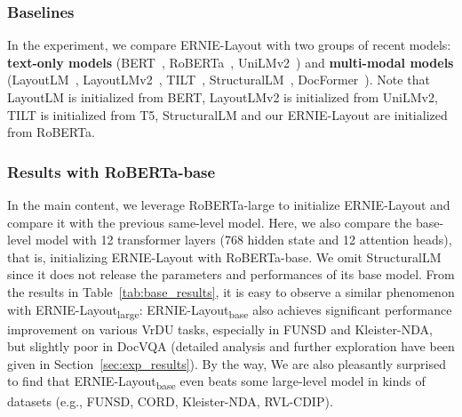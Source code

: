 \documentclass[11pt]{article}
\begin{document}
\subsubsection{Baselines}

In the experiment, we compare ERNIE-Layout with two groups of recent models: \textbf{text-only models} (BERT~\cite{devlin2019bert}, RoBERTa~\cite{liu2019roberta}, UniLMv2~\cite{bao2020unilmv2}) and \textbf{multi-modal models} (LayoutLM~\cite{xu2020layoutlm}, LayoutLMv2~\cite{xu2021layoutlmv2}, TILT~\cite{powalski2021going}, StructuralLM~\cite{li2021structext}, DocFormer~\cite{appalaraju2021docformer}).
Note that LayoutLM is initialized from BERT, LayoutLMv2 is initialized from UniLMv2, TILT is initialized from T5,  StructuralLM and our ERNIE-Layout are initialized from RoBERTa.

\subsubsection{Results with RoBERTa-base}

In the main content, we leverage RoBERTa-large to initialize ERNIE-Layout and compare it with the previous same-level model. 
Here, we also compare the base-level model with 12 transformer layers (768 hidden state and 12 attention heads), that is, initializing ERNIE-Layout with RoBERTa-base.
We omit StructuralLM since it does not release the parameters and performances of its base model.
From the results in Table~\ref{tab:base_results}, it is easy to observe a similar phenomenon with ERNIE-Layout\textsubscript{large}: ERNIE-Layout\textsubscript{base} also achieves significant performance improvement on various VrDU tasks, especially in FUNSD and Kleister-NDA, but slightly poor in DocVQA (detailed analysis and further exploration have been given in Section~\ref{sec:exp_results}).
By the way, We are also pleasantly surprised to find that ERNIE-Layout\textsubscript{base} even beats some large-level model in kinds of datasets (e.g., FUNSD, CORD, Kleister-NDA, RVL-CDIP).
\end{document}
